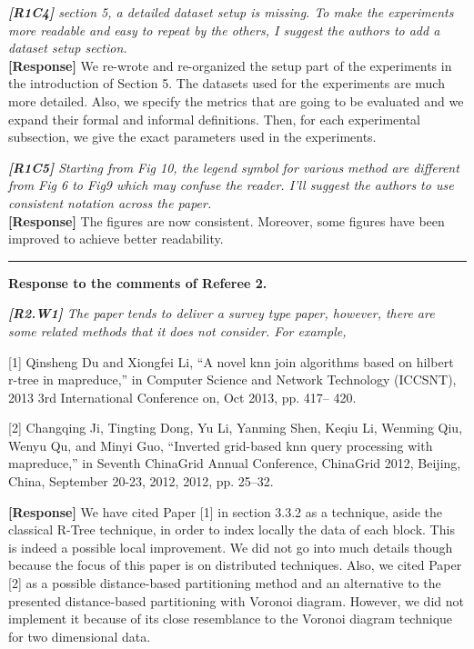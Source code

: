 \documentclass[11pt]{letter}
\newcommand{\svs}{\vspace{0.36ex}}
\newcommand{\TODO}[1]{\textcolor{red}{\textbf{[TODO:#1]}}}
\begin{document}
\svs
\noindent
{\em
{\bf [R1C4]}  section 5, a detailed dataset setup is missing. To make the experiments more readable and easy to repeat 
by the others, I suggest the authors to add a dataset setup section.}\\
\textbf{[Response]}
We re-wrote and re-organized the setup part of the experiments in the introduction of Section 5. The datasets used for 
the experiments are much more detailed. Also, we specify  the metrics that are going to be evaluated and we 
expand their formal and informal definitions.
Then, for each experimental subsection, we give the exact parameters used in the experiments.

\svs
\noindent
{\em
{\bf [R1C5]}  Starting from Fig 10, the legend symbol for various method are different from Fig 6 to Fig9 which may 
confuse the reader. I'll suggest the authors to use consistent notation across the paper.}\\
\textbf{[Response]}
The figures are now consistent. Moreover, some figures have been improved to achieve better readability. 

\svs
\vspace{2.8ex}
\hrule
\vspace{0.6ex}
{\bf Response to the comments of Referee 2.}

\noindent
{\em
{\bf [R2.W1]}
The paper tends to deliver a survey type paper, however, there are some related
methods that it does not consider.
For example,

{\small [1] Qinsheng Du and Xiongfei Li, “A novel knn join algorithms based on hilbert r-tree in mapreduce,” in Computer Science and Network Technology (ICCSNT), 2013 3rd International Conference on, Oct 2013, pp. 417– 420.

[2]  Changqing Ji, Tingting Dong, Yu Li, Yanming Shen, Keqiu Li, Wenming Qiu, Wenyu Qu, and Minyi Guo, “Inverted grid-based knn query processing with mapreduce,” in Seventh ChinaGrid Annual Conference, ChinaGrid 2012, Beijing, China, September 20-23, 2012, 2012, pp. 25–32.}
}
\svs

\textbf{[Response]}
We have cited Paper [1] in section 3.3.2 as a technique, aside the 
classical R-Tree technique, in order to index locally the data of each block. This is indeed a possible local 
improvement. We did not go into much details though because the focus of this paper is on distributed techniques.
Also, we cited Paper [2] as a possible distance-based partitioning method and an alternative to the presented 
distance-based partitioning with Voronoi diagram. However, we did not implement it because of its close resemblance 
to the Voronoi diagram  technique for two dimensional data.
\end{document}
